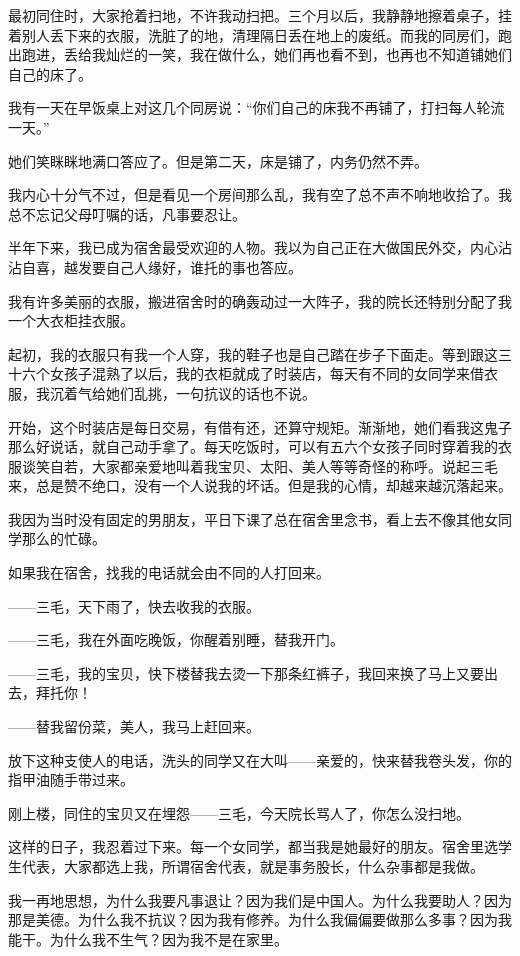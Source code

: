 \par 最初同住时，大家抢着扫地，不许我动扫把。三个月以后，我静静地擦着桌子，挂着别人丢下来的衣服，洗脏了的地，清理隔日丢在地上的废纸。而我的同房们，跑出跑进，丢给我灿烂的一笑，我在做什么，她们再也看不到，也再也不知道铺她们自己的床了。
\par 我有一天在早饭桌上对这几个同房说：“你们自己的床我不再铺了，打扫每人轮流一天。”
\par 她们笑眯眯地满口答应了。但是第二天，床是铺了，内务仍然不弄。
\par 我内心十分气不过，但是看见一个房间那么乱，我有空了总不声不响地收拾了。我总不忘记父母叮嘱的话，凡事要忍让。
\par 半年下来，我已成为宿舍最受欢迎的人物。我以为自己正在大做国民外交，内心沾沾自喜，越发要自己人缘好，谁托的事也答应。
\par 我有许多美丽的衣服，搬进宿舍时的确轰动过一大阵子，我的院长还特别分配了我一个大衣柜挂衣服。
\par 起初，我的衣服只有我一个人穿，我的鞋子也是自己踏在步子下面走。等到跟这三十六个女孩子混熟了以后，我的衣柜就成了时装店，每天有不同的女同学来借衣服，我沉着气给她们乱挑，一句抗议的话也不说。
\par 开始，这个时装店是每日交易，有借有还，还算守规矩。渐渐地，她们看我这鬼子那么好说话，就自己动手拿了。每天吃饭时，可以有五六个女孩子同时穿着我的衣服谈笑自若，大家都亲爱地叫着我宝贝、太阳、美人等等奇怪的称呼。说起三毛来，总是赞不绝口，没有一个人说我的坏话。但是我的心情，却越来越沉落起来。
\par 我因为当时没有固定的男朋友，平日下课了总在宿舍里念书，看上去不像其他女同学那么的忙碌。
\par 如果我在宿舍，找我的电话就会由不同的人打回来。
\par ——三毛，天下雨了，快去收我的衣服。
\par ——三毛，我在外面吃晚饭，你醒着别睡，替我开门。
\par ——三毛，我的宝贝，快下楼替我去烫一下那条红裤子，我回来换了马上又要出去，拜托你！
\par ——替我留份菜，美人，我马上赶回来。
\par 放下这种支使人的电话，洗头的同学又在大叫——亲爱的，快来替我卷头发，你的指甲油随手带过来。
\par 刚上楼，同住的宝贝又在埋怨——三毛，今天院长骂人了，你怎么没扫地。
\par 这样的日子，我忍着过下来。每一个女同学，都当我是她最好的朋友。宿舍里选学生代表，大家都选上我，所谓宿舍代表，就是事务股长，什么杂事都是我做。
\par 我一再地思想，为什么我要凡事退让？因为我们是中国人。为什么我要助人？因为那是美德。为什么我不抗议？因为我有修养。为什么我偏偏要做那么多事？因为我能干。为什么我不生气？因为我不是在家里。
